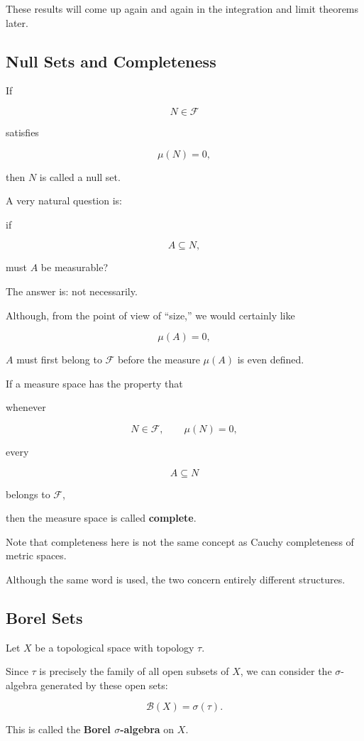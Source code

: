 \documentclass[11pt]{article}
\begin{document}
These results will come up again and again in the integration and limit theorems later.

\subsection{Null Sets and Completeness}

If

\[
N\in\mathcal{F}
\]

satisfies

\[
\mu(N)=0,
\]

then $N$ is called a null set.

A very natural question is:

if

\[
A\subseteq N,
\]

must $A$ be measurable?

The answer is: not necessarily.

Although, from the point of view of ``size,'' we would certainly like

\[
\mu(A)=0,
\]

$A$ must first belong to $\mathcal{F}$ before the measure $\mu(A)$ is even defined.

If a measure space has the property that

whenever

\[
N\in\mathcal{F},\qquad\mu(N)=0,
\]

every

\[
A\subseteq N
\]

belongs to $\mathcal{F}$,

then the measure space is called \textbf{complete}.

Note that completeness here is not the same concept as Cauchy completeness of metric spaces.

Although the same word is used, the two concern entirely different structures.

\subsection{Borel Sets}

Let $X$ be a topological space with topology $\tau$.

Since $\tau$ is precisely the family of all open subsets of $X$, we can consider the $\sigma$-algebra generated by these open sets:

\[
\mathcal{B}(X)=\sigma(\tau).
\]

This is called the \textbf{Borel $\sigma$-algebra} on $X$.
\end{document}
